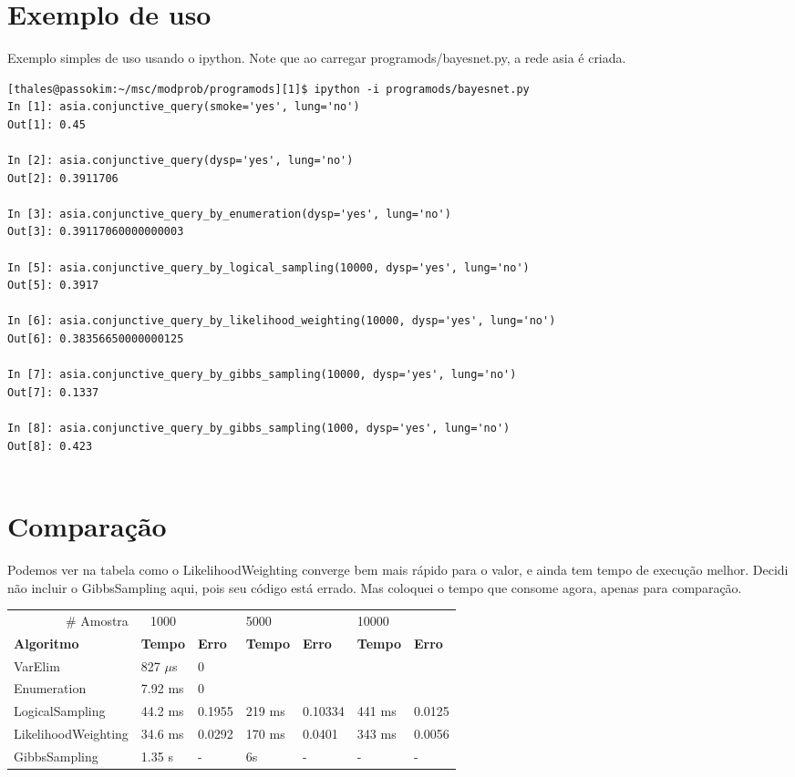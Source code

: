 \documentclass[paper=a4, fontsize=11pt]{scrartcl} %
\numberwithin{equation}{subsection}
\numberwithin{figure}{subsection}
\numberwithin{table}{subsection}
\numberwithin{definition}{subsection}
\numberwithin{theorem}{subsection}
\numberwithin{property}{subsection}
\numberwithin{proposition}{subsection}
\numberwithin{equation}{section}
\numberwithin{figure}{section}
\numberwithin{table}{section}
\numberwithin{definition}{section}
\numberwithin{theorem}{section}
\numberwithin{property}{section}
\numberwithin{proposition}{section}
\begin{document}
\section{Exemplo de uso}

Exemplo simples de uso usando o ipython. Note que ao carregar programods/bayesnet.py, a rede asia é criada.
\begin{verbatim}
[thales@passokim:~/msc/modprob/programods][1]$ ipython -i programods/bayesnet.py 
In [1]: asia.conjunctive_query(smoke='yes', lung='no')
Out[1]: 0.45

In [2]: asia.conjunctive_query(dysp='yes', lung='no')
Out[2]: 0.3911706

In [3]: asia.conjunctive_query_by_enumeration(dysp='yes', lung='no')
Out[3]: 0.39117060000000003

In [5]: asia.conjunctive_query_by_logical_sampling(10000, dysp='yes', lung='no')
Out[5]: 0.3917

In [6]: asia.conjunctive_query_by_likelihood_weighting(10000, dysp='yes', lung='no')
Out[6]: 0.38356650000000125

In [7]: asia.conjunctive_query_by_gibbs_sampling(10000, dysp='yes', lung='no')
Out[7]: 0.1337

In [8]: asia.conjunctive_query_by_gibbs_sampling(1000, dysp='yes', lung='no')
Out[8]: 0.423


\end{verbatim}


\section{Comparação} \FloatBarrier

Podemos ver na tabela como o LikelihoodWeighting converge bem mais rápido para o valor, e ainda tem tempo de 
execução melhor. Decidi não incluir o GibbsSampling aqui, pois seu código está errado. Mas coloquei o tempo
que consome agora, apenas para comparação.

\begin{table}[]
\centering
\label{my-label}
\begin{tabular}{lllllll}
\multicolumn{1}{r}{\# Amostra} & \multicolumn{1}{c}{1000} &               & 5000           &               & 10000          &               \\
\textbf{Algoritmo}  & \textbf{Tempo} & \textbf{Erro} & \textbf{Tempo} & \textbf{Erro} & \textbf{Tempo} & \textbf{Erro} \\
VarElim             & 827 $\mu$s         & 0             &                &               &                &               \\
Enumeration         & 7.92 ms        & 0             &                &               &                &               \\
LogicalSampling     & 44.2 ms        & 0.1955        & 219 ms         & 0.10334       & 441 ms         & 0.0125        \\
LikelihoodWeighting & 34.6 ms        & 0.0292        & 170 ms         & 0.0401        & 343 ms         & 0.0056        \\
GibbsSampling       & 1.35 s         & -             & 6s             & -             & -              & -            
\end{tabular}
\end{table}
\end{document}
